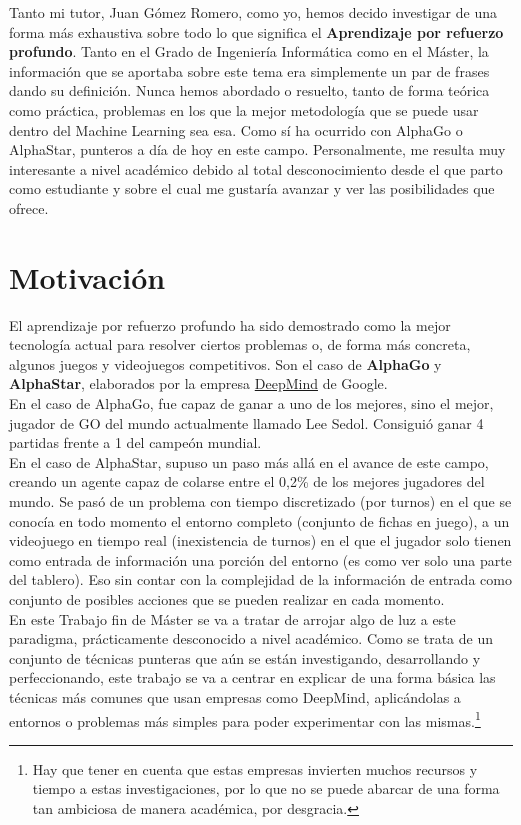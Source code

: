 \documentclass[11pt,fleqn]{book} %
\begin{document}
Tanto mi tutor, Juan Gómez Romero, como yo, hemos decido investigar de una forma más exhaustiva sobre todo lo que significa el \textbf{Aprendizaje por refuerzo profundo}. Tanto en el Grado de Ingeniería Informática como en el Máster, la información que se aportaba sobre este tema era simplemente un par de frases dando su definición. Nunca hemos abordado o resuelto, tanto de forma teórica como práctica, problemas en los que la mejor metodología que se puede usar dentro del Machine Learning sea esa. Como sí ha ocurrido con AlphaGo o AlphaStar, punteros a día de hoy en este campo. Personalmente, me resulta muy interesante a nivel académico debido al total desconocimiento desde el que parto como estudiante y sobre el cual me gustaría avanzar y ver las posibilidades que ofrece.

\section{Motivación}\label{sec:DRL2}

El aprendizaje por refuerzo profundo ha sido demostrado como la mejor tecnología actual para resolver ciertos problemas o, de forma más concreta, algunos juegos y videojuegos competitivos. Son el caso de \textbf{AlphaGo} y \textbf{AlphaStar}, elaborados por la empresa \href{https://deepmind.com/}{DeepMind} de Google.\cite{article:DeepMind} \\

En el caso de AlphaGo, fue capaz de ganar a uno de los mejores, sino el mejor, jugador de GO del mundo actualmente llamado Lee Sedol. Consiguió ganar 4 partidas frente a 1 del campeón mundial.\cite{article:leesedol} \cite{article:leesedol2} \\

En el caso de AlphaStar, supuso un paso más allá en el avance de este campo, creando un agente capaz de colarse entre el 0,2\% de los mejores jugadores del mundo. Se pasó de un problema con tiempo discretizado (por turnos) en el que se conocía en todo momento el entorno completo (conjunto de fichas en juego), a un videojuego en tiempo real (inexistencia de turnos) en el que el jugador solo tienen como entrada de información una porción del entorno (es como ver solo una parte del tablero). Eso sin contar con la complejidad de la información de entrada como conjunto de posibles acciones que se pueden realizar en cada momento.\cite{article:vinyals} \cite{article:vinyals2} \\

En este Trabajo fin de Máster se va a tratar de arrojar algo de luz a este paradigma, prácticamente desconocido a nivel académico. Como se trata de un conjunto de técnicas punteras que aún se están investigando, desarrollando y perfeccionando, este trabajo se va a centrar en explicar de una forma básica las técnicas más comunes que usan empresas como DeepMind, aplicándolas a entornos o problemas más simples para poder experimentar con las mismas.\footnote{Hay que tener en cuenta que estas empresas invierten muchos recursos y tiempo a estas investigaciones, por lo que no se puede abarcar de una forma tan ambiciosa de manera académica, por desgracia.} \\
\end{document}

